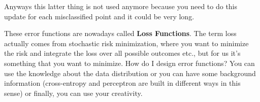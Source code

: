 Anyways this latter thing is not used anymore because you need to do this update for each misclassified point and it could be very long.

These error functions are nowadays called \textbf{Loss Functions}. The term loss actually comes from stochastic risk minimization, where you want to minimize the risk and integrate the loss over all possible outcomes etc., but for us it's something that you want to minimize. How do I design error functions? You can use the knowledge about the data distribution or you can have some background information (cross-entropy and perceptron are built in different ways in this sense) or finally, you can use your creativity.
